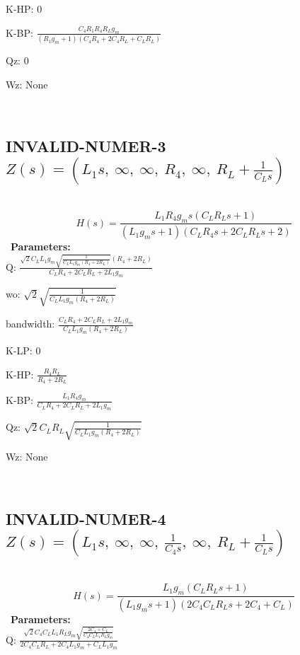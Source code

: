 \documentclass{article}
\begin{document}
K-HP: $0$\ 

K-BP: $\frac{C_{4} R_{1} R_{4} R_{L} g_{m}}{\left(R_{1} g_{m} + 1\right) \left(C_{4} R_{4} + 2 C_{4} R_{L} + C_{L} R_{L}\right)}$\ 

Qz: $0$\ 

Wz: $\text{None}$\ 

\ 

\subsection{INVALID-NUMER-3 $Z(s) = \left( L_{1} s, \  \infty, \  \infty, \  R_{4}, \  \infty, \  R_{L} + \frac{1}{C_{L} s}\right)$ } \ 
\textbf{\[H(s) = \frac{L_{1} R_{4} g_{m} s \left(C_{L} R_{L} s + 1\right)}{\left(L_{1} g_{m} s + 1\right) \left(C_{L} R_{4} s + 2 C_{L} R_{L} s + 2\right)}\] } \ 
\textbf{Parameters:}\\ 

Q: $\frac{\sqrt{2} C_{L} L_{1} g_{m} \sqrt{\frac{1}{C_{L} L_{1} g_{m} \left(R_{4} + 2 R_{L}\right)}} \left(R_{4} + 2 R_{L}\right)}{C_{L} R_{4} + 2 C_{L} R_{L} + 2 L_{1} g_{m}}$\ 

wo: $\sqrt{2} \sqrt{\frac{1}{C_{L} L_{1} g_{m} \left(R_{4} + 2 R_{L}\right)}}$\ 

bandwidth: $\frac{C_{L} R_{4} + 2 C_{L} R_{L} + 2 L_{1} g_{m}}{C_{L} L_{1} g_{m} \left(R_{4} + 2 R_{L}\right)}$\ 

K-LP: $0$\ 

K-HP: $\frac{R_{4} R_{L}}{R_{4} + 2 R_{L}}$\ 

K-BP: $\frac{L_{1} R_{4} g_{m}}{C_{L} R_{4} + 2 C_{L} R_{L} + 2 L_{1} g_{m}}$\ 

Qz: $\sqrt{2} C_{L} R_{L} \sqrt{\frac{1}{C_{L} L_{1} g_{m} \left(R_{4} + 2 R_{L}\right)}}$\ 

Wz: $\text{None}$\ 

\ 

\subsection{INVALID-NUMER-4 $Z(s) = \left( L_{1} s, \  \infty, \  \infty, \  \frac{1}{C_{4} s}, \  \infty, \  R_{L} + \frac{1}{C_{L} s}\right)$ } \ 
\textbf{\[H(s) = \frac{L_{1} g_{m} \left(C_{L} R_{L} s + 1\right)}{\left(L_{1} g_{m} s + 1\right) \left(2 C_{4} C_{L} R_{L} s + 2 C_{4} + C_{L}\right)}\] } \ 
\textbf{Parameters:}\\ 

Q: $\frac{\sqrt{2} C_{4} C_{L} L_{1} R_{L} g_{m} \sqrt{\frac{2 C_{4} + C_{L}}{C_{4} C_{L} L_{1} R_{L} g_{m}}}}{2 C_{4} C_{L} R_{L} + 2 C_{4} L_{1} g_{m} + C_{L} L_{1} g_{m}}$\ 
\end{document}
